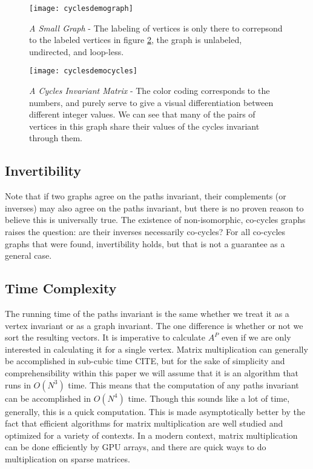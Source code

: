 \begin{figure}[h]
\label{fig:cyclesdemograph}
\caption{\emph{A Small Graph} - The labeling of vertices is only there to correpsond to the labeled vertices in figure \ref{fig:cyclesdemocycles}, the graph is unlabeled, undirected, and loop-less.}
\centering
\texttt{[image: cyclesdemograph]}
\end{figure}

\begin{figure}[h]
\label{fig:cyclesdemocycles}
\caption{\emph{A Cycles Invariant Matrix} - The color coding corresponds to the numbers, and purely serve to give a visual differentiation between different integer values.  We can see that many of the pairs of vertices in this graph share their values of the cycles invariant through them.}
\centering
\texttt{[image: cyclesdemocycles]}
\end{figure}

\subsection{Invertibility}
Note that if two graphs agree on the paths invariant, their complements (or inverses) may also agree on the paths invariant, but there is no proven reason to believe this is universally true.
The existence of non-isomorphic, co-cycles graphs raises the question: are their inverses necessarily co-cycles?
For all co-cycles graphs that were found, invertibility holds, but that is not a guarantee as a general case.


\subsection{Time Complexity}
The running time of the paths invariant is the same whether we treat it as a vertex invariant or as a graph invariant.
The one difference is whether or not we sort the resulting vectors.
It is imperative to calculate $A^P$ even if we are only interested in calculating it for a single vertex.
Matrix multiplication can generally be accomplished in sub-cubic time CITE, but for the sake of simplicity and comprehensibility within this paper we will assume that it is an algorithm that runs in $O(N^3)$  time.
This means that the computation of any paths invariant can be accomplished in $O(N^4)$ time.
Though this sounds like a lot of time, generally, this is a quick computation.
This is made asymptotically better by the fact that efficient algorithms for matrix multiplication are well studied and optimized for a variety of contexts.
In a modern context, matrix multiplication can be done efficiently by GPU arrays, and there are quick ways to do multiplication on sparse matrices.


